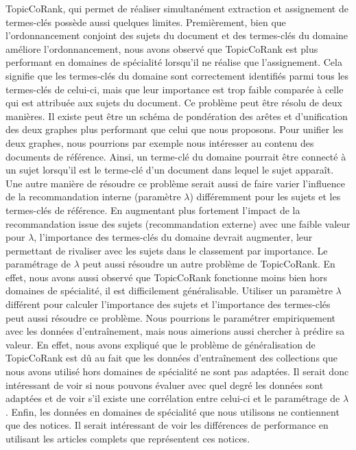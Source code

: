     TopicCoRank, qui permet de réaliser simultanément extraction et assignement
    de ter\-mes-clés possède aussi quelques limites. Premièrement, bien que
    l'ordonnancement conjoint des sujets du document et des termes-clés du
    domaine améliore l'ordonnancement, nous avons observé que TopicCoRank est
    plus performant en domaines de spécialité lorsqu'il ne réalise que
    l'assignement. Cela signifie que les termes-clés du domaine sont
    correctement identifiés parmi tous les termes-clés de celui-ci, mais que
    leur importance est trop faible comparée à celle qui est attribuée aux
    sujets du document. Ce problème peut être résolu de deux manières. Il existe
    peut être un schéma de pondération des arêtes et d'unification des deux
    graphes plus performant que celui que nous proposons. Pour unifier les deux
    graphes, nous pourrions par exemple nous intéresser au contenu des documents
    de référence. Ainsi, un terme-clé du domaine pourrait être connecté à un
    sujet lorsqu'il est le terme-clé d'un document dans lequel le sujet
    apparaît. Une autre manière de résoudre ce problème serait aussi de faire
    varier l'influence de la recommandation interne (paramètre $\lambda$)
    différemment pour les sujets et les termes-clés de référence. En augmentant
    plus fortement l'impact de la recommandation issue des sujets
    (recommandation externe) avec une faible valeur pour $\lambda$,
    l'importance des termes-clés du domaine devrait augmenter, leur permettant
    de rivaliser avec les sujets dans le classement par importance. Le paramétrage de
    $\lambda$ peut aussi résoudre un autre problème de TopicCoRank. En effet,
    nous avons aussi observé que TopicCoRank fonctionne moins bien hors domaines
    de spécialité, il est difficilement généralisable. Utiliser un paramètre
    $\lambda$ différent pour calculer l'importance des sujets et l'importance
    des termes-clés peut aussi résoudre ce problème. Nous pourrions le
    paramétrer empiriquement avec les données d'entraînement, mais nous
    aimerions aussi chercher à prédire sa valeur. En effet, nous avons expliqué
    que le problème de généralisation de TopicCoRank est dû au fait que les
    données d'entraînement des collections que nous avons utilisé hors domaines
    de spécialité ne sont pas adaptées. Il serait donc intéressant de voir si
    nous pouvons évaluer avec quel degré les données sont adaptées et de voir
    s'il existe une corrélation entre celui-ci et le paramétrage de $\lambda$.
    Enfin, les données en domaines de spécialité que nous utilisons ne
    contiennent que des notices. Il serait intéressant de voir les différences
    de performance en utilisant les articles complets que représentent ces notices.

